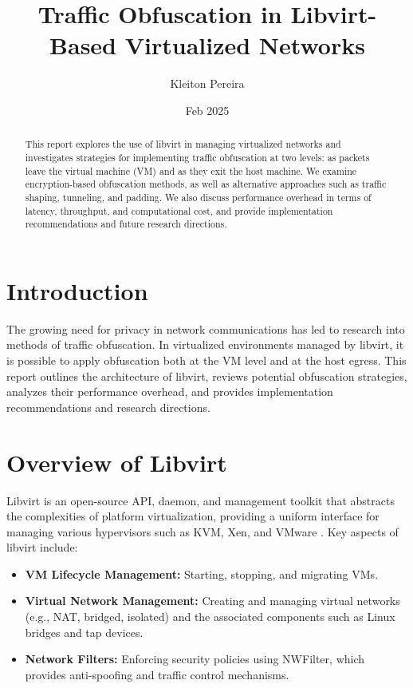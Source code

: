 \documentclass{article}
\title{Traffic Obfuscation in Libvirt-Based Virtualized Networks}
\author{Kleiton Pereira}
\date{Feb 2025}
\begin{document}
\maketitle

\begin{abstract}
This report explores the use of libvirt in managing virtualized networks and investigates strategies for implementing traffic obfuscation at two levels: as packets leave the virtual machine (VM) and as they exit the host machine. We examine encryption-based obfuscation methods, as well as alternative approaches such as traffic shaping, tunneling, and padding. We also discuss performance overhead in terms of latency, throughput, and computational cost, and provide implementation recommendations and future research directions.
\end{abstract}

\section{Introduction}
The growing need for privacy in network communications has led to research into methods of traffic obfuscation. In virtualized environments managed by libvirt, it is possible to apply obfuscation both at the VM level and at the host egress. This report outlines the architecture of libvirt, reviews potential obfuscation strategies, analyzes their performance overhead, and provides implementation recommendations and research directions. 

\section{Overview of Libvirt}
Libvirt is an open-source API, daemon, and management toolkit that abstracts the complexities of platform virtualization, providing a uniform interface for managing various hypervisors such as KVM, Xen, and VMware \cite{libvirt2013}. Key aspects of libvirt include:
\begin{itemize}[noitemsep]
    \item \textbf{VM Lifecycle Management:} Starting, stopping, and migrating VMs.
    \item \textbf{Virtual Network Management:} Creating and managing virtual networks (e.g., NAT, bridged, isolated) and the associated components such as Linux bridges and tap devices.
    \item \textbf{Network Filters:} Enforcing security policies using NWFilter, which provides anti-spoofing and traffic control mechanisms.
\end{itemize}
\end{document}
